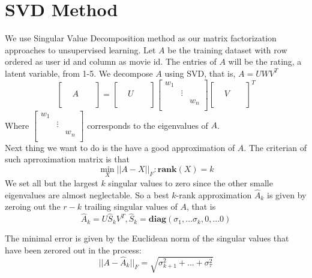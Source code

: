 \documentclass{article}
\begin{document}
\section{SVD Method} 
We use Singular Value Decomposition method as our matrix factorization approaches to unsupervised learning. Let $A$ be the training dataset with row ordered as user id and column as movie id. The entries of $A$ will be the rating, a latent variable, from 1-5. We decompose $A$ using SVD, that is, $A=UWV^T$
\begin{equation}
\begin{bmatrix}
&&&\\
&A&\\
&&&\\
\end{bmatrix}=\begin{bmatrix}
&&&\\
&U&\\
&&&\\
\end{bmatrix}
\begin{bmatrix}
w_1&&\\
&\vdots&\\
&&w_n\\
\end{bmatrix}
\begin{bmatrix}
&&&\\
&V&\\
&&&\\
\end{bmatrix}^T
\end{equation}
Where $\begin{bmatrix}
w_1&&\\
&\vdots&\\
&&w_n\\
\end{bmatrix}$ corresponds to the eigenvalues of $A$. \\

Next thing we want to do is the have a good approximation of $A$. The criterian of such aprroximation matrix is that 
\[\min_{X}||A-X||_F: \textbf{rank}(X)=k \]
We set all but the largest $k$ singular values to zero since the other smalle eigenvalues are almost neglectable. So a best $k$-rank approximation $\hat{A}_k$ is given by zeroing out the $r-k$ trailing singular values of $A$, that is 
\[\hat{A}_k=U\hat{S}_kV^T, \hat{S}_k=\textbf{diag}(\sigma_1,...\sigma_k,0,...0)\]

The minimal error is given by the Euclidean norm of the singular values that have been zerored out in the process: 
\[||A-\hat{A}_k||_F=\sqrt{\sigma_{k+1}^2+...+\sigma_{\tau}^2}\]
\end{document}
